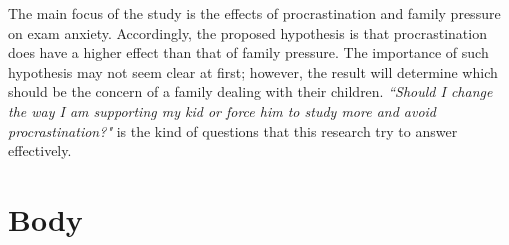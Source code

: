 \documentclass[12pt]{report}
\begin{document}
\begin{multicols}{2}
The main focus of the study is the effects
of procrastination and family pressure on exam anxiety. Accordingly, the
proposed hypothesis is that procrastination does have a higher effect than that
of family pressure. The importance of such hypothesis may not seem clear at
first; however, the result will determine which should be the concern of a
family dealing with their children. \textit{``Should I change the way I am
supporting my kid or force him to study more and avoid procrastination?"} is the
kind of questions that this research try to answer effectively.

\end{multicols}

\chapter{Body}
\end{document}
